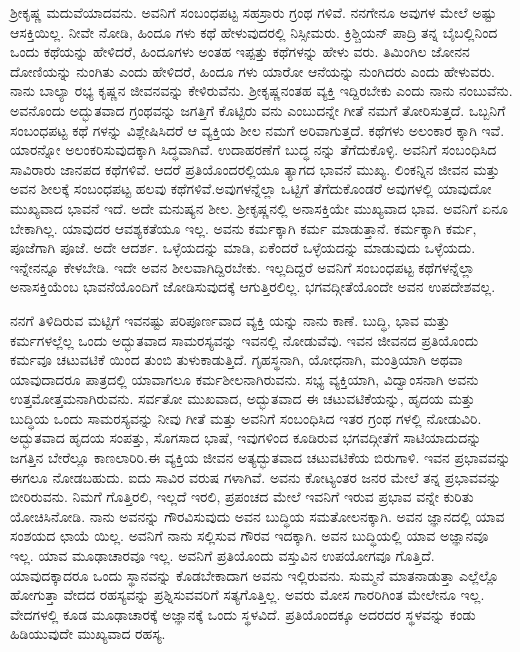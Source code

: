 ಶ‍್ರೀಕೃಷ್ಣ ಮದುವೆಯಾದವನು. ಅವನಿಗೆ ಸಂಬಂಧಪಟ್ಟ ಸಹಸ್ರಾರು ಗ್ರಂಥ ಗಳಿವೆ. ನನಗೇನೂ ಅವುಗಳ ಮೇಲೆ ಅಷ್ಟು ಆಸಕ್ತಿಯಿಲ್ಲ. ನೀವೇ ನೋಡಿ, ಹಿಂದೂ ಗಳು ಕಥೆ ಹೇಳುವುದರಲ್ಲಿ ನಿಸ್ಸೀಮರು. ಕ್ರಿಶ್ಚಿಯನ್​ ಪಾದ್ರಿ ತನ್ನ ಬೈಬಲ್ಲಿನಿಂದ ಒಂದು ಕಥೆಯನ್ನು ಹೇಳಿದರೆ, ಹಿಂದೂಗಳು ಅಂತಹ ಇಪ್ಪತ್ತು ಕಥೆಗಳನ್ನು ಹೇಳು ವರು. ತಿಮಿಂಗಿಲ ಜೋನನ ದೋಣಿಯನ್ನು ನುಂಗಿತು ಎಂದು ಹೇಳಿದರೆ, ಹಿಂದೂ ಗಳು ಯಾರೋ ಆನೆಯನ್ನು ನುಂಗಿದರು ಎಂದು ಹೇಳುವರು. ನಾನು ಬಾಲ್ಯಾ ರಭ್ಯ ಕೃಷ್ಣನ ಜೀವನವನ್ನು ಕೇಳಿರುವೆನು. ಶ‍್ರೀಕೃಷ್ಣನಂತಹ ವ್ಯಕ್ತಿ ಇದ್ದಿರಬೇಕು ಎಂದು ನಾನು ನಂಬುವೆನು. ಅವನೊಂದು ಅದ್ಭುತವಾದ ಗ್ರಂಥವನ್ನು ಜಗತ್ತಿಗೆ ಕೊಟ್ಟಿರು ವನು ಎಂಬುದನ್ನೇ ಗೀತೆ ನಮಗೆ ತೋರಿಸುತ್ತದೆ. ಒಬ್ಬನಿಗೆ ಸಂಬಂಧಪಟ್ಟ ಕಥೆ ಗಳನ್ನು ವಿಶ್ಲೇಷಿಸಿದರೆ ಆ ವ್ಯಕ್ತಿಯ ಶೀಲ ನಮಗೆ ಅರಿವಾಗುತ್ತದೆ. ಕಥೆಗಳು ಅಲಂಕಾರ ಕ್ಕಾಗಿ ಇವೆ. ಯಾರನ್ನೋ ಅಲಂಕರಿಸುವುದಕ್ಕಾಗಿ ಸಿದ್ಧವಾಗಿವೆ. ಉದಾಹರಣೆಗೆ ಬುದ್ಧ ನನ್ನು ತೆಗೆದುಕೊಳ್ಳಿ. ಅವನಿಗೆ ಸಂಬಂಧಿಸಿದ ಸಾವಿರಾರು ಜಾನಪದ ಕಥೆಗಳಿವೆ. ಆದರೆ ಪ್ರತಿಯೊಂದರಲ್ಲಿಯೂ ತ್ಯಾಗದ ಭಾವನೆ ಮುಖ್ಯ. ಲಿಂಕನ್ನಿನ ಜೀವನ ಮತ್ತು ಅವನ ಶೀಲಕ್ಕೆ ಸಂಬಂಧಪಟ್ಟ ಹಲವು ಕಥೆಗಳಿವೆ.ಅವುಗಳನ್ನೆಲ್ಲಾ ಒಟ್ಟಿಗೆ ತೆಗೆದುಕೊಂಡರೆ ಅವುಗಳಲ್ಲಿ ಯಾವುದೋ ಮುಖ್ಯವಾದ ಭಾವನೆ ಇದೆ. ಅದೇ ಮನುಷ್ಯನ ಶೀಲ. ಶ‍್ರೀಕೃಷ್ಣನಲ್ಲಿ ಅನಾಸಕ್ತಿಯೇ ಮುಖ್ಯವಾದ ಭಾವ. ಅವನಿಗೆ ಏನೂ ಬೇಕಾಗಿಲ್ಲ. ಯಾವುದರ ಆವಶ್ಯಕತೆಯೂ ಇಲ್ಲ. ಅವನು ಕರ್ಮಕ್ಕಾಗಿ ಕರ್ಮ ಮಾಡುತ್ತಾನೆ. ಕರ್ಮಕ್ಕಾಗಿ ಕರ್ಮ, ಪೂಜೆಗಾಗಿ ಪೂಜೆ. ಅದೇ ಆದರ್ಶ. ಒಳ್ಳೆಯದನ್ನು ಮಾಡಿ, ಏಕೆಂದರೆ ಒಳ್ಳೆಯದನ್ನು ಮಾಡುವುದು ಒಳ್ಳೆಯದು. ಇನ್ನೇನನ್ನೂ ಕೇಳಬೇಡಿ. ಇದೇ ಅವನ ಶೀಲವಾಗಿದ್ದಿರಬೇಕು. ಇಲ್ಲದಿದ್ದರೆ ಅವನಿಗೆ ಸಂಬಂಧಪಟ್ಟ ಕಥೆಗಳನ್ನೆಲ್ಲಾ ಅನಾಸಕ್ತಿಯೆಂಬ ಭಾವನೆಯೊಂದಿಗೆ ಜೋಡಿಸುವುದಕ್ಕೆ ಆಗುತ್ತಿರಲಿಲ್ಲ. ಭಗವದ್ಗೀತೆಯೊಂದೇ ಅವನ ಉಪದೇಶವಲ್ಲ.

ನನಗೆ ತಿಳಿದಿರುವ ಮಟ್ಟಿಗೆ ಇವನಷ್ಟು ಪರಿಪೂರ್ಣವಾದ ವ್ಯಕ್ತಿ ಯನ್ನು ನಾನು ಕಾಣೆ. ಬುದ್ಧಿ, ಭಾವ ಮತ್ತು ಕರ್ಮಗಳಲ್ಲೆಲ್ಲ ಒಂದು ಅದ್ಭುತವಾದ ಸಾಮರಸ್ಯವನ್ನು ಇವನಲ್ಲಿ ನೋಡುವೆವು. ಇವನ ಜೀವನದ ಪ್ರತಿಯೊಂದು ಕರ್ಮವೂ ಚಟುವಟಿಕೆ ಯಿಂದ ತುಂಬಿ ತುಳುಕಾಡುತ್ತಿದೆ. ಗೃಹಸ್ಥನಾಗಿ, ಯೋಧನಾಗಿ, ಮಂತ್ರಿಯಾಗಿ ಅಥವಾ ಯಾವುದಾದರೂ ಪಾತ್ರದಲ್ಲಿ ಯಾವಾಗಲೂ ಕರ್ಮಶೀಲನಾಗಿರುವನು. ಸಭ್ಯ ವ್ಯಕ್ತಿಯಾಗಿ, ವಿದ್ವಾಂಸನಾಗಿ ಅವನು ಉತ್ತಮೋತ್ತಮನಾಗಿರುವನು. ಸರ್ವತೋ ಮುಖವಾದ, ಅದ್ಭುತವಾದ ಈ ಚಟುವಟಿಕೆಯನ್ನು, ಹೃದಯ ಮತ್ತು ಬುದ್ಧಿಯ ಒಂದು ಸಾಮರಸ್ಯವನ್ನು ನೀವು ಗೀತೆ ಮತ್ತು ಅವನಿಗೆ ಸಂಬಂಧಿಸಿದ ಇತರ ಗ್ರಂಥ ಗಳಲ್ಲಿ ನೋಡುವಿರಿ. ಅದ್ಭುತವಾದ ಹೃದಯ ಸಂಪತ್ತು, ಸೊಗಸಾದ ಭಾಷೆ, ಇವುಗಳಿಂದ ಕೂಡಿರುವ ಭಗವದ್ಗೀತೆಗೆ ಸಾಟಿಯಾದುದನ್ನು ಜಗತ್ತಿನ ಬೇರೆಲ್ಲೂ ಕಾಣಲಾರಿರಿ.ಈ ವ್ಯಕ್ತಿಯ ಜೀವನ ಅತ್ಯದ್ಭುತವಾದ ಚಟುವಟಿಕೆಯ ಬಿರುಗಾಳಿ. ಇವನ ಪ್ರಭಾವವನ್ನು ಈಗಲೂ ನೋಡಬಹುದು. ಐದು ಸಾವಿರ ವರುಷ ಗಳಾಗಿವೆ. ಅವನು ಕೋಟ್ಯಂತರ ಜನರ ಮೇಲೆ ತನ್ನ ಪ್ರಭಾವವನ್ನು ಬೀರಿರುವನು. ನಿಮಗೆ ಗೊತ್ತಿರಲಿ, ಇಲ್ಲದೆ ಇರಲಿ, ಪ್ರಪಂಚದ ಮೇಲೆ ಇವನಿಗೆ ಇರುವ ಪ್ರಭಾವ ವನ್ನೇ ಕುರಿತು ಯೋಚಿಸಿನೋಡಿ. ನಾನು ಅವನನ್ನು ಗೌರವಿಸುವುದು ಅವನ ಬುದ್ಧಿಯ ಸಮತೋಲನಕ್ಕಾಗಿ. ಅವನ ಜ್ಞಾನದಲ್ಲಿ ಯಾವ ಸಂಶಯದ ಛಾಯೆ ಯಿಲ್ಲ. ಅವನಿಗೆ ನಾನು ಸಲ್ಲಿಸುವ ಗೌರವ ಇದಕ್ಕಾಗಿ. ಅವನ ಬುದ್ಧಿಯಲ್ಲಿ ಯಾವ ಅಜ್ಞಾನವೂ ಇಲ್ಲ. ಯಾವ ಮೂಢಾಚಾರವೂ ಇಲ್ಲ. ಅವನಿಗೆ ಪ್ರತಿಯೊಂದು ವಸ್ತುವಿನ ಉಪಯೋಗವೂ ಗೊತ್ತಿದೆ. ಯಾವುದಕ್ಕಾದರೂ ಒಂದು ಸ್ಥಾನವನ್ನು ಕೊಡಬೇಕಾದಾಗ ಅವನು ಇಲ್ಲಿರುವನು. ಸುಮ್ಮನೆ ಮಾತನಾಡುತ್ತಾ ಎಲ್ಲೆಲ್ಲೊ ಹೋಗುತ್ತಾ ವೇದದ ರಹಸ್ಯವನ್ನು ಪ್ರಶ್ನಿಸುವವರಿಗೆ ಸತ್ಯಗೊತ್ತಿಲ್ಲ. ಅವರು ಮೋಸ ಗಾರರಿಗಿಂತ ಮೇಲೇನೂ ಇಲ್ಲ. ವೇದಗಳಲ್ಲಿ ಕೂಡ ಮೂಢಾಚಾರಕ್ಕೆ ಅಜ್ಞಾನಕ್ಕೆ ಒಂದು ಸ್ಥಳವಿದೆ. ಪ್ರತಿಯೊಂದಕ್ಕೂ ಅದರದರ ಸ್ಥಳವನ್ನು ಕಂಡು ಹಿಡಿಯುವುದೇ ಮುಖ್ಯವಾದ ರಹಸ್ಯ.

